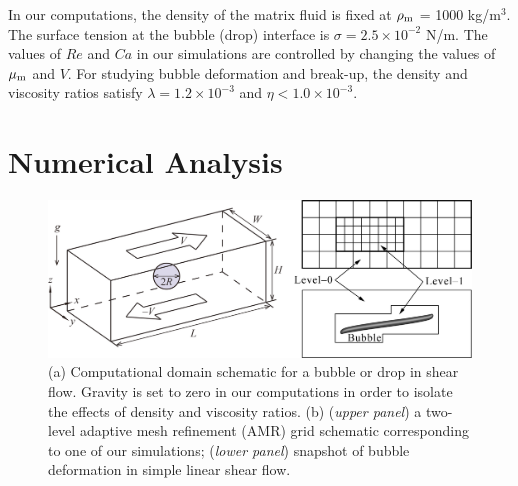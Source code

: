 \documentclass[%
 reprint,
 showkeys,
 amsmath,amssymb,
 aps,
 prfluids,
 onecolumn
]{revtex4-2}
\begin{document}
{\color{red} In our computations, the density of the matrix fluid is fixed at
$\rho_{\rm m}$ = 1000 kg/m$^3$.  The surface tension at the bubble (drop)
interface is $\sigma =2.5 \times 10^{-2}$ N/m.  The values of $Re$ and $Ca$ in
our simulations are controlled by changing the values of $\mu_{\rm m}$ and $V$.
For studying bubble deformation and break-up, the density and viscosity ratios
satisfy $\lambda = 1.2 \times 10^{-3}$ and $\eta < 1.0 \times 10^{-3}$.}


\section{Numerical Analysis}
% 
\begin{figure}%
  \centering
  \includegraphics[width=\textwidth]{SchematicAndGrid}
  \caption{(a) Computational domain schematic for a bubble or drop in shear 
           flow.  Gravity is set to zero in our computations in order to isolate
           the effects of density and viscosity ratios.  
           (b) (\textit{upper panel}) a two-level adaptive mesh 
           refinement (AMR) grid schematic corresponding to one of our
           simulations;
           (\textit{lower panel}) snapshot of bubble deformation 
           in simple linear shear flow.}
  \label{fig:SchemAndGrid}
\end{figure}
%
\end{document}
